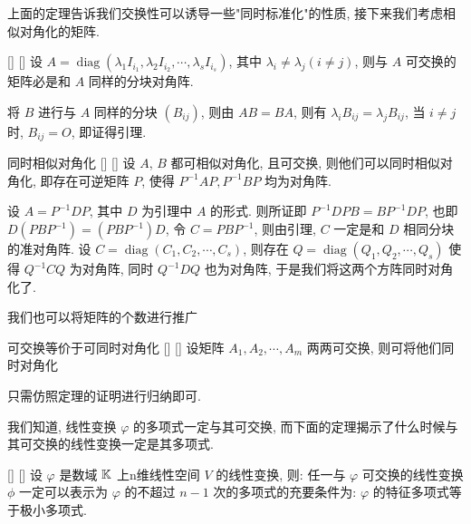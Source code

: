\documentclass[UTF8]{ctexart}
\DeclareMathOperator{\0}{\mathbf{0}}
\DeclareMathOperator{\<}{\langle}
\renewcommand{\>}{\rangle}
\DeclareMathOperator{\diag}{diag}
\begin{document}
		上面的定理告诉我们交换性可以诱导一些"同时标准化"的性质, 接下来我们考虑相似对角化的矩阵.\\
		\begin{lma}
			[]
			{}
			[]
			[]
			设 \(A=\diag(\lambda_1I_{i_1},\lambda_2I_{i_2},\cdots,\lambda_sI_{i_s})\), 其中 \(\lambda_i\neq\lambda_j(i\neq j)\), 则与 \(A\) 可交换的矩阵必是和 \(A\) 同样的分块对角阵.
		\end{lma}
		\begin{prf}
			将 \(B\) 进行与 \(A\) 同样的分块 \((B_{ij})\), 则由 \(AB=BA\), 则有 \(\lambda_iB_{ij}=\lambda_jB_{ij}\), 当 \(i\neq j\) 时,  \(B_{ij}=O\), 即证得引理.
		\end{prf}
		\begin{thm}
			[]
			{同时相似对角化}
			[]
			[]
			设 \(A\), \(B\) 都可相似对角化, 且可交换, 则他们可以同时相似对角化, 即存在可逆矩阵 \(P\), 使得 \(P^{-1}AP,P^{-1}BP\) 均为对角阵.
		\end{thm}
		
		\begin{prf}
			设 \(A=P^{-1}DP\), 其中 \(D\) 为引理中 \(A\) 的形式. 则所证即 \(P^{-1}DPB=BP^{-1}DP\), 也即 \(D(PBP^{-1})=(PBP^{-1})D\), 令 \(C=PBP^{-1}\), 则由引理,  \(C\) 一定是和 \(D\) 相同分块的准对角阵. 设 \(C=\diag(C_1,C_2,\cdots,C_s)\), 则存在 \(Q=\diag(Q_1,Q_2,\cdots,Q_s)\) 使得 \(Q^{-1}CQ\) 为对角阵, 同时 \(Q^{-1}DQ\) 也为对角阵, 于是我们将这两个方阵同时对角化了.
		\end{prf}
		我们也可以将矩阵的个数进行推广
		\begin{crl}
			[]
			{可交换等价于可同时对角化}
			[]
			[]
			设矩阵 \(A_1,A_2,\cdots,A_m\) 两两可交换, 则可将他们同时对角化
		\end{crl}
		\begin{prf}
			只需仿照定理的证明进行归纳即可.
		\end{prf}

		我们知道, 线性变换 \(\varphi\) 的多项式一定与其可交换, 而下面的定理揭示了什么时候与其可交换的线性变换一定是其多项式.
		\begin{thm}
			[]
			{}
			[]
			[]
			设 \(\varphi\) 是数域 \(\operatorname{\mathbb{K}}\) 上n维线性空间 \(V\) 的线性变换, 则: 任一与 \(\varphi\) 可交换的线性变换 \(\phi\) 一定可以表示为 \(\varphi\) 的不超过 \(n-1\) 次的多项式的充要条件为:  \(\varphi\) 的特征多项式等于极小多项式.
		\end{thm}
\end{document}
